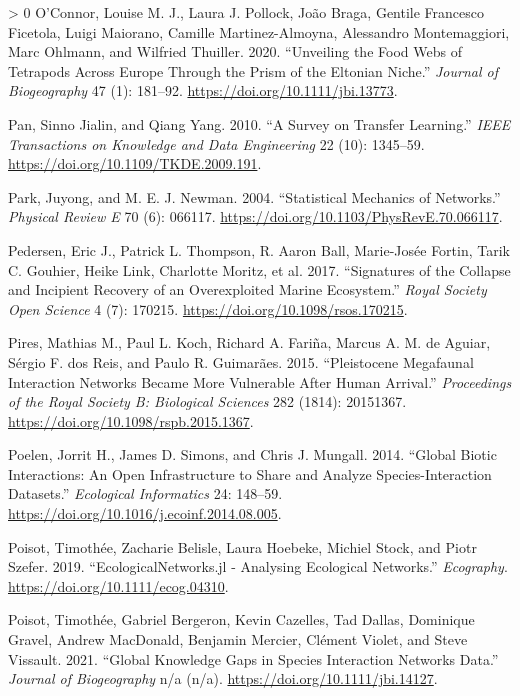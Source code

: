 \documentclass[11pt]{article}
\newlength{\cslhangindent}
\newenvironment{CSLReferences}[3] %
 {%
  \setlength{\parindent}{0pt}
  \ifodd #1 \everypar{\setlength{\hangindent}{\cslhangindent}}\ignorespaces\fi
  \ifnum #2 > 0
  \setlength{\parskip}{#2\baselineskip}
  \fi
 }%
 {}
\begin{document}
\begin{CSLReferences}{1}{0}
\leavevmode\hypertarget{ref-OConnor2020UnvFoo}{}%
O'Connor, Louise M. J., Laura J. Pollock, João Braga, Gentile Francesco
Ficetola, Luigi Maiorano, Camille Martinez-Almoyna, Alessandro
Montemaggiori, Marc Ohlmann, and Wilfried Thuiller. 2020. {``Unveiling
the Food Webs of Tetrapods Across Europe Through the Prism of the
Eltonian Niche.''} \emph{Journal of Biogeography} 47 (1): 181--92.
\url{https://doi.org/10.1111/jbi.13773}.

\leavevmode\hypertarget{ref-Pan2010SurTra}{}%
Pan, Sinno Jialin, and Qiang Yang. 2010. {``A Survey on Transfer
Learning.''} \emph{IEEE Transactions on Knowledge and Data Engineering}
22 (10): 1345--59. \url{https://doi.org/10.1109/TKDE.2009.191}.

\leavevmode\hypertarget{ref-Park2004StaMec}{}%
Park, Juyong, and M. E. J. Newman. 2004. {``Statistical Mechanics of
Networks.''} \emph{Physical Review E} 70 (6): 066117.
\url{https://doi.org/10.1103/PhysRevE.70.066117}.

\leavevmode\hypertarget{ref-Pedersen2017SigCol}{}%
Pedersen, Eric J., Patrick L. Thompson, R. Aaron Ball, Marie-Josée
Fortin, Tarik C. Gouhier, Heike Link, Charlotte Moritz, et al. 2017.
{``Signatures of the Collapse and Incipient Recovery of an Overexploited
Marine Ecosystem.''} \emph{Royal Society Open Science} 4 (7): 170215.
\url{https://doi.org/10.1098/rsos.170215}.

\leavevmode\hypertarget{ref-Pires2015PleMeg}{}%
Pires, Mathias M., Paul L. Koch, Richard A. Fariña, Marcus A. M. de
Aguiar, Sérgio F. dos Reis, and Paulo R. Guimarães. 2015. {``Pleistocene
Megafaunal Interaction Networks Became More Vulnerable After Human
Arrival.''} \emph{Proceedings of the Royal Society B: Biological
Sciences} 282 (1814): 20151367.
\url{https://doi.org/10.1098/rspb.2015.1367}.

\leavevmode\hypertarget{ref-Poelen2014GloBio}{}%
Poelen, Jorrit H., James D. Simons, and Chris J. Mungall. 2014.
{``Global Biotic Interactions: An Open Infrastructure to Share and
Analyze Species-Interaction Datasets.''} \emph{Ecological Informatics}
24: 148--59. \url{https://doi.org/10.1016/j.ecoinf.2014.08.005}.

\leavevmode\hypertarget{ref-Poisot2019EcoJl}{}%
Poisot, Timothée, Zacharie Belisle, Laura Hoebeke, Michiel Stock, and
Piotr Szefer. 2019. {``EcologicalNetworks.jl - Analysing Ecological
Networks.''} \emph{Ecography}. \url{https://doi.org/10.1111/ecog.04310}.

\leavevmode\hypertarget{ref-Poisot2021GloKno}{}%
Poisot, Timothée, Gabriel Bergeron, Kevin Cazelles, Tad Dallas,
Dominique Gravel, Andrew MacDonald, Benjamin Mercier, Clément Violet,
and Steve Vissault. 2021. {``Global Knowledge Gaps in Species
Interaction Networks Data.''} \emph{Journal of Biogeography} n/a (n/a).
\url{https://doi.org/10.1111/jbi.14127}.


\end{CSLReferences}
\end{document}
